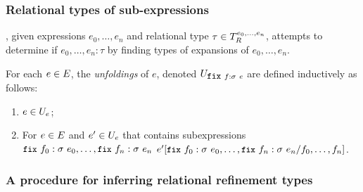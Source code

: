 \subsubsection{Relational types of sub-expressions}
\label{sec:bnd-unfoldings}
%
\sys, given expressions $e_0, \ldots, e_n$ and relational type
$\tau \in T_{R}^{e_0, \ldots, e_n}$, attempts to determine if
$e_0, \ldots, e_n : \tau$ by finding types of expansions of
$e_0, \ldots, e_n$.
%
\begin{defn}
  \label{defn:unfoldings}
  For each $e \in E$, the \emph{unfoldings} of $e$, denoted
  $\unfoldings{ \fix{f}{\sigma}{e} }$ are defined inductively as follows:
  \begin{enumerate}
  \item %
    $e \in U_{ e }$;
  \item %
    For $e \in E$ and $e' \in U_{e}$ that contains
    subexpressions
    $\fix{f_0}{\sigma}{e_0}, \ldots, \fix{f_n}{\sigma}{e_n}$
    $\replace{e'}{f_0, \ldots, f_n}{ \fix{f_0}{\sigma}{e_0}, \ldots,
      \fix{f_n}{\sigma}{e_n} }$.
  \end{enumerate}
\end{defn}
%

\subsubsection{A procedure for inferring relational refinement types}
\label{sec:infer-alg}

